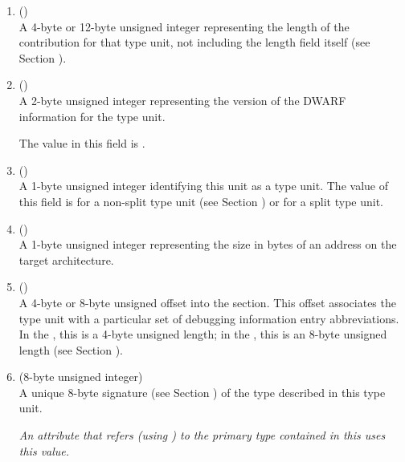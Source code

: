 \begin{enumerate}[1. ]
\item \HFNunitlength{} () \\
A 4-byte or 12-byte unsigned integer 
representing the length
of the \dotdebuginfo{} contribution for that type unit,
not including the length field itself
\bb
(see Section ).
\eb

\item  \HFNversion{} (\HFTuhalf) \\
A 2-byte unsigned integer representing the version of the
DWARF information for the type unit.
 
The value in this field is \versiondotdebuginfo.

\item \HFNunittype{} (\HFTubyte) \\
A 1-byte unsigned integer identifying this unit as a type unit.
The value of this field is \DWUTtype{} for a non-split type unit
(see Section )
or \DWUTsplittype{} for a split type unit.

\item \HFNaddresssize{} (\HFTubyte) \\
A 1-byte unsigned integer representing the size 
in bytes of
an address on the target architecture.
\db

\item \HFNdebugabbrevoffset{} () \\
A 
4-byte or 8-byte unsigned offset into the 
\dotdebugabbrev{}
section. This offset associates the type unit with a
particular set of debugging information entry abbreviations. In
the \thirtytwobitdwarfformat, this is a 4-byte unsigned length;
in the \sixtyfourbitdwarfformat, this is an 8-byte unsigned length
(see Section ).

\item \HFNtypesignature{} (8-byte unsigned integer) \\
A unique 8-byte signature (see Section 
)
of the type described in this type unit.  

\textit{An attribute that refers (using 
\DWFORMrefsigeight{}) to
the primary type contained in this 
 uses this value.}


\end{enumerate}
